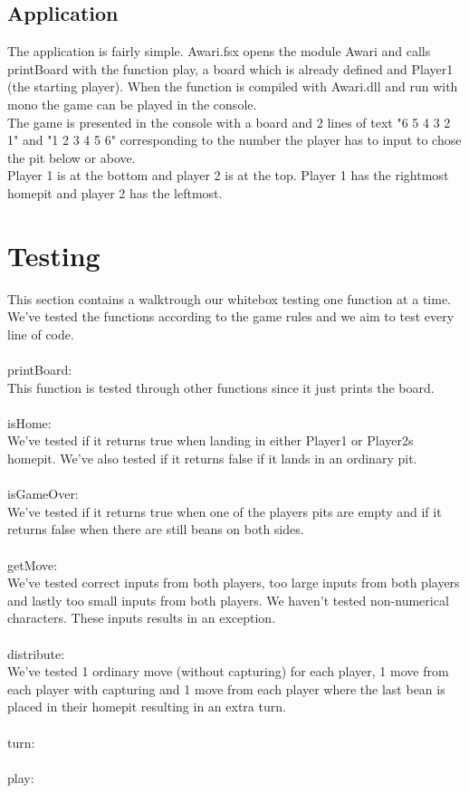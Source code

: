 \documentclass{article}
\begin{document}
\subsection*{Application}
The application is fairly simple. Awari.fsx opens the module Awari and calls printBoard with the function play, a board which is already defined and Player1 (the starting player).
When the function is compiled with Awari.dll and run with mono the game can be played in the console.\\
The game is presented in the console with a board and 2 lines of text "6 5 4 3 2 1" and "1 2 3 4 5 6" corresponding to the number the player has to input to chose the pit below or above.\\
Player 1 is at the bottom and player 2 is at the top. Player 1 has the rightmost homepit and player 2 has the leftmost.
\section*{Testing}
This section contains a walktrough our whitebox testing one function at a time.
We've tested the functions according to the game rules and we aim to test every line of code.\\
\\
printBoard:\\
This function is tested through other functions since it just prints the board.\\
\\
isHome:\\
We've tested if it returns true when landing in either Player1 or Player2s homepit. We've also tested if it returns false if it lands in an ordinary pit.\\
\\
isGameOver:\\
We've tested if it returns true when one of the players pits are empty and if it returns false when there are still beans on both sides.\\
\\
getMove:\\
We've tested correct inputs from both players, too large inputs from both players and lastly too small inputs from both players. We haven't tested non-numerical characters. These inputs results in an exception.\\
\\
distribute:\\
We've tested 1 ordinary move (without capturing) for each player, 1 move from each player with capturing and 1 move from each player where the last bean is placed in their homepit resulting in an extra turn.\\
\\
turn:\\
\\
play:\\
\lstset{xleftmargin=-50pt,xrightmargin=-50pt}
\pagebreak
\end{document}
